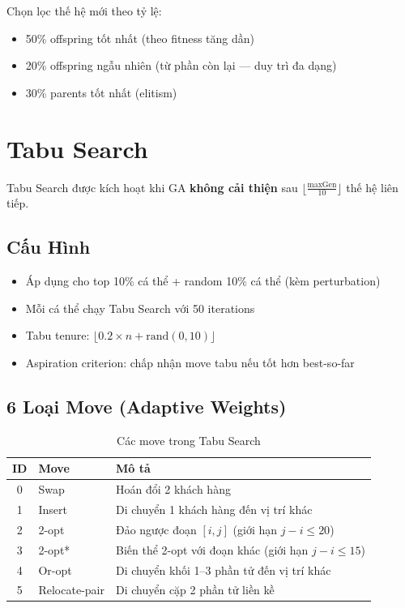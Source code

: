 \documentclass[12pt,a4paper]{article}
\begin{document}
Chọn lọc thế hệ mới theo tỷ lệ:
\begin{itemize}[nosep]
    \item 50\% offspring tốt nhất (theo fitness tăng dần)
    \item 20\% offspring ngẫu nhiên (từ phần còn lại --- duy trì đa dạng)
    \item 30\% parents tốt nhất (elitism)
\end{itemize}

\section{Tabu Search}

Tabu Search được kích hoạt khi GA \textbf{không cải thiện} sau $\lfloor \frac{\text{maxGen}}{10} \rfloor$ thế hệ liên tiếp.

\subsection{Cấu Hình}

\begin{itemize}[nosep]
    \item Áp dụng cho top 10\% cá thể + random 10\% cá thể (kèm perturbation)
    \item Mỗi cá thể chạy Tabu Search với 50 iterations
    \item Tabu tenure: $\lfloor 0.2 \times n + \text{rand}(0,10) \rfloor$
    \item Aspiration criterion: chấp nhận move tabu nếu tốt hơn best-so-far
\end{itemize}

\subsection{6 Loại Move (Adaptive Weights)}

\begin{table}[h!]
\centering
\caption{Các move trong Tabu Search}
\begin{tabular}{clp{8cm}}
\toprule
\textbf{ID} & \textbf{Move} & \textbf{Mô tả} \\
\midrule
0 & Swap & Hoán đổi 2 khách hàng \\
1 & Insert & Di chuyển 1 khách hàng đến vị trí khác \\
2 & 2-opt & Đảo ngược đoạn $[i, j]$ (giới hạn $j - i \leq 20$) \\
3 & 2-opt* & Biến thể 2-opt với đoạn khác (giới hạn $j - i \leq 15$) \\
4 & Or-opt & Di chuyển khối 1--3 phần tử đến vị trí khác \\
5 & Relocate-pair & Di chuyển cặp 2 phần tử liền kề \\
\bottomrule
\end{tabular}
\end{table}
\end{document}
